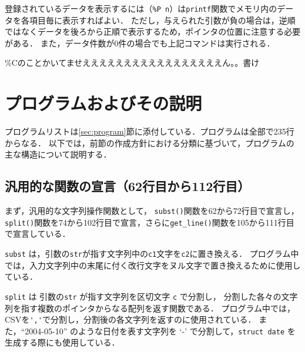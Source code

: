 \documentclass[a4j,11pt]{jarticle}
\begin{document}
登録されているデータを表示するには（\verb|%P n|）は\verb|printf|関数でメモリ内のデータを各項目毎に表示すればよい．
ただし，与えられた引数が負の場合は，逆順ではなくデータを後ろから正順で表示するため，ポインタの位置に注意する必要がある．
また，データ件数が0件の場合でも上記コマンドは実行される．


\%Cのことかいてませえええええええええええええええええん。。書け
\section{プログラムおよびその説明}\label{sec:explain}



プログラムリストは\ref{sec:program}節に添付している．プログラムは全部で235行からなる．
以下では，前節の作成方針における分類に基づいて，プログラムの主な構造について説明する．

\subsection{汎用的な関数の宣言（62行目から112行目）}

まず，汎用的な文字列操作関数として，
\verb|subst()|関数を62から72行目で宣言し，\verb|split()|関数を74から102行目で宣言，さらに\verb|get_line()|関数を105から111行目で宣言している．

\verb|subst| は，引数の\verb|str|が指す文字列中の\verb|c1|文字を\verb|c2|に置き換える．
プログラム中では，入力文字列中の末尾に付く改行文字をヌル文字で置き換えるために使用している．

\verb|split| は 引数の\verb|str| が指す文字列を区切文字 \verb|c| で分割し，
分割した各々の文字列を指す複数のポインタからなる配列を返す関数である．
プログラム中では，CSVを\verb|','|で分割し，分割後の各文字列を返すのに使用されている．
また，``2004-05-10'' のような日付を表す文字列を `-' で分割して，\verb|struct date| を生成する際にも使用している．
\end{document}
